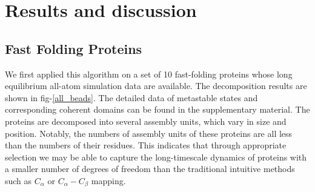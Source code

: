 \documentclass[journal=jacsat,manuscript=article]{achemso}
\begin{document}
\section{Results and discussion}

\subsection{Fast Folding Proteins}

We first applied this algorithm on a set of 10 fast-folding proteins whose long equilibrium all-atom simulation data are available\cite{DE_Shaw_fast-folding}. The decomposition results are shown in fig-\ref{all_beads}. The detailed data of metastable states and corresponding coherent domains can be found in the supplementary material. The proteins are decomposed into several assembly units, which vary in size and position. Notably, the numbers of assembly units of these proteins are all less than the numbers of their residues. This indicates that through appropriate selection we may be able to capture the long-timescale dynamics of proteins with a smaller number of degrees of freedom than the traditional intuitive methods such as $C_{\alpha}$ or $C_{\alpha}-C_{\beta}$ mapping.
\end{document}
